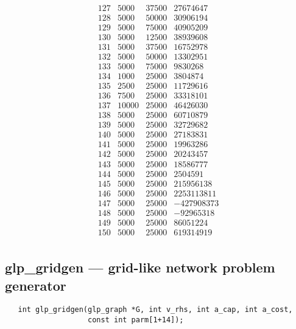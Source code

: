 \documentclass[11pt]{report}
\def\para#1{\noindent{\bf#1}}
\def\synopsis{\para{Synopsis}}
\begin{document}
$$\begin{array}{crrr}
127     & 5000  & 37500 &    27674647 \\
128     & 5000  & 50000 &    30906194 \\
129     & 5000  & 75000 &    40905209 \\
130     & 5000  & 12500 &    38939608 \\
131     & 5000  & 37500 &    16752978 \\
132     & 5000  & 50000 &    13302951 \\
133     & 5000  & 75000 &     9830268 \\
134     & 1000  & 25000 &     3804874 \\
135     & 2500  & 25000 &    11729616 \\
136     & 7500  & 25000 &    33318101 \\
137    & 10000  & 25000 &    46426030 \\
138     & 5000  & 25000 &    60710879 \\
139     & 5000  & 25000 &    32729682 \\
140     & 5000  & 25000 &    27183831 \\
141     & 5000  & 25000 &    19963286 \\
142     & 5000  & 25000 &    20243457 \\
143     & 5000  & 25000 &    18586777 \\
144     & 5000  & 25000 &     2504591 \\
145     & 5000  & 25000 &   215956138 \\
146     & 5000  & 25000 &  2253113811 \\
147     & 5000  & 25000 &  -427908373 \\
148     & 5000  & 25000 &   -92965318 \\
149     & 5000  & 25000 &    86051224 \\
150     & 5000  & 25000 &   619314919 \\
\end{array}
$$

\newpage

\subsection{glp\_gridgen --- grid-like network problem generator}

\synopsis

\begin{verbatim}
   int glp_gridgen(glp_graph *G, int v_rhs, int a_cap, int a_cost,
                   const int parm[1+14]);
\end{verbatim}
\end{document}

